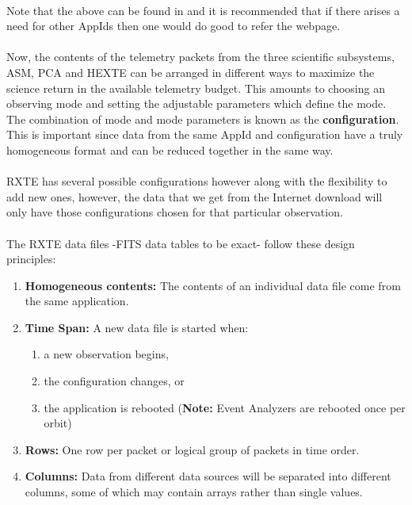\documentclass[a4paper,twoside]{report}
\numberwithin{equation}{section}
\begin{document}
\paragraph{}
Note that the above can be found in \cite{RXTEG1} and it is recommended that if there arises a need for other AppIds then one would do good to refer the webpage.
\paragraph{}
Now, the contents of the telemetry packets from the three scientific subsystems, ASM, PCA and HEXTE can be arranged in different ways to maximize the science return in the available telemetry budget. This amounts to choosing an observing mode and setting the adjustable parameters which define the mode. The combination of mode and mode parameters is known as the \textbf{configuration}. This is important since data from the same AppId and configuration have a truly homogeneous format and can be reduced together in the same way. 
\paragraph{}
RXTE has several possible configurations however along with the flexibility to add new ones, however, the data that we get from the Internet download will only have those configurations chosen for that particular observation. 
\paragraph{}
The RXTE data files -FITS data tables to be exact- follow these design principles:
\begin{enumerate}
\item \textbf{Homogeneous contents:} The contents of an individual data file come from the same application.
\item {\textbf{Time Span:} A new data file is started when:
\begin{enumerate}
\item a new observation begins,
\item the configuration changes, or
\item the application is rebooted (\textbf{Note:} Event Analyzers are rebooted once per orbit)
\end{enumerate}
}
\item \textbf{Rows:} One row per packet or logical group of packets in time order. 
\item \textbf{Columns:} Data from different data sources will be separated into different columns, some of which may contain arrays rather than single values.
\end{enumerate}
\end{document}

